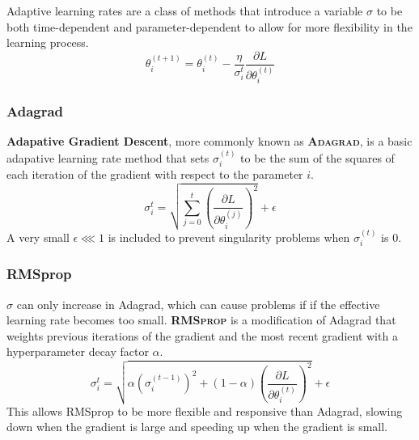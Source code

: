 \documentclass[12pt]{report}
\theoremstyle{definition}
\theoremstyle{remark}
\begin{document}
Adaptive learning rates are a class of methods that introduce a variable $\sigma$ to be both time-dependent and parameter-dependent to allow for more flexibility in the learning process.
\begin{equation}
    \theta_{i}^{(t+1)} = \theta_{i}^{(t)} - \frac{\eta}{\sigma_i^t}\frac{\partial L}{\partial \theta_i^{(t)}}
\end{equation}

\subsubsection{Adagrad}
\textbf{Adapative Gradient Descent}, more commonly known as \textbf{\textsc{Adagrad}}, is a basic adapative learning rate method that sets $\sigma_i^{(t)}$ to be the sum of the squares of each iteration of the gradient with respect to the parameter $i$.
\begin{equation}
    \sigma_i^t = \sqrt{\sum_{j=0}^t {\left(\frac{\partial L}{\partial \theta_i^{(j)}}\right)}^2} + \epsilon
\end{equation}
A very small $\epsilon \lll 1$ is included to prevent singularity problems when $\sigma_i^{(t)}$ is $0$.

\subsubsection{RMSprop}
$\sigma$ can only increase in Adagrad, which can cause problems if if the effective learning rate becomes too small. \textbf{\textsc{RMSprop}} is a modification of Adagrad that weights previous iterations of the gradient and the most recent gradient with a hyperparameter decay factor $\alpha$.
\begin{equation}
    \sigma_i^t = \sqrt{\alpha {(\sigma_i^{(t-1)})}^2 + (1-\alpha)\left(\frac{\partial L}{\partial \theta_i^{(t)}}\right)^2} + \epsilon
\end{equation}
This allows RMSprop to be more flexible and responsive than Adagrad, slowing down when the gradient is large and speeding up when the gradient is small.
\end{document}
